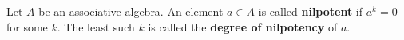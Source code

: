 Let $A$ be an associative algebra. An element $a \in A$ is called \textbf{nilpotent} if $a^k = 0$ for some $k$. The least such $k$ is called the \textbf{degree of nilpotency} of $a$.
